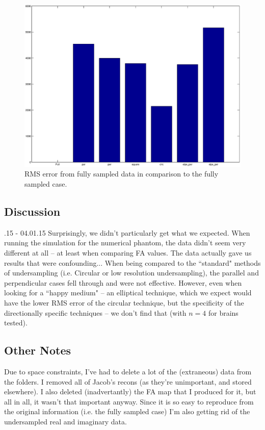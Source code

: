 \documentclass[11 pt]{article}
\begin{document}
    \begin{figure}[h]
      \centering
      \vspace{0pt}
      \setlength\fboxsep{0pt}
      \setlength\fboxrule{0.5pt}
      \includegraphics[trim = {10mm 0mm 10mm 0mm},clip,scale = 0.4] {Figs/numericalSims/brainRMS.eps}
      \caption{RMS error from fully sampled data in comparison to the fully sampled case.}
      \label{fig:RMSBrain}

    \end{figure}
    
  
  \subsection{Discussion}
  
  .15 - 04.01.15
  Surprisingly, we didn't particularly get what we expected. When running the simulation for the numerical phantom, the data didn't seem very different at all -- at least when comparing FA values. The data actually gave us results that were confounding... When being compared to the ``standard" methods of undersampling (i.e. Circular or low resolution undersampling), the parallel and perpendicular cases fell through and were not effective. However, even when looking for a ``happy medium" -- an elliptical technique, which we expect would have the lower RMS error of the circular technique, but the specificity of the directionally specific techniques -- we don't find that (with $n = 4$ for brains tested).
  
  
  \subsection{Other Notes}
  
  Due to space constraints, I've had to delete a lot of the (extraneous) data from the folders. I removed all of Jacob's recons (as they're unimportant, and stored elsewhere). I also deleted (inadvertantly) the FA map that I produced for it, but all in all, it wasn't that important anyway. Since it is so easy to reproduce from the original information (i.e. the fully sampled case) I'm also getting rid of the undersampled real and imaginary data. 
  
  
  
\end{document}
